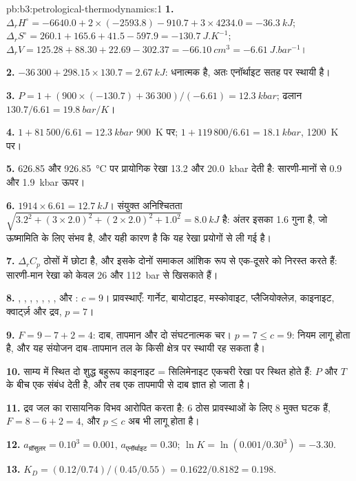 \begin{solution}{pb:b3:petrological-thermodynamics:1}
\textbf{1.} $\Delta_rH^\circ = -6640.0 + 2\times(-2593.8) - 910.7 + 3\times4234.0
= \qty{-36.3}{kJ}$; $\Delta_rS^\circ = 260.1 + 165.6 + 41.5 - 597.9 =
\qty{-130.7}{J.K^{-1}}$; $\Delta_rV = 125.28 + 88.30 + 22.69 - 302.37 =
\qty{-66.10}{cm^3} = \qty{-6.61}{J.bar^{-1}}$।

\textbf{2.} $-36\,300 + 298.15\times130.7 = \qty{+2.67}{kJ}$: धनात्मक है, अतः
एनॉर्थाइट सतह पर स्थायी है।

\textbf{3.} $P = 1 + (900\times(-130.7) + 36\,300)/(-6.61) = \qty{12.3}{kbar}$;
ढलान $130.7/6.61 = \qty{19.8}{bar/K}$।

\textbf{4.} $1 + 81\,500/6.61 = \qty{12.3}{kbar}$ \qty{900}{K} पर; $1 +
119\,800/6.61 = \qty{18.1}{kbar}$, \qty{1200}{K} पर।

\textbf{5.} 626.85 और \qty{926.85}{\celsius} पर प्रायोगिक रेखा
13.2 और \qty{20.0}{kbar} देती है: सारणी-मानों से 0.9 और \qty{1.9}{kbar} ऊपर।

\textbf{6.} $1914\times6.61 = \qty{12.7}{kJ}$। संयुक्त अनिश्चितता
$\sqrt{3.2^2 + (3\times2.0)^2 + (2\times2.0)^2 + 1.0^2} = \qty{8.0}{kJ}$ है: अंतर इसका
1.6 गुना है, जो ऊष्मामिति के लिए संभव है, और यही कारण है कि यह रेखा
प्रयोगों से ली गई है।

\textbf{7.} $\Delta_rC_p$ ठोसों में छोटा है, और इसके दोनों समाकल आंशिक रूप से
एक-दूसरे को निरस्त करते हैं: सारणी-मान रेखा को केवल 26 और \qty{112}{bar} से खिसकाते हैं।

\textbf{8.} , , , , , ,
,  और : $c = 9$। प्रावस्थाएँ: गार्नेट, बायोटाइट,
मस्कोवाइट, प्लैजियोक्लेज़, काइनाइट, क्वार्ट्ज़ और द्रव, $p = 7$।

\textbf{9.} $F = 9 - 7 + 2 = 4$: दाब, तापमान और दो संघटनात्मक
चर। $p = 7 \le c = 9$: नियम लागू होता है, और यह संयोजन
दाब--तापमान तल के किसी क्षेत्र पर स्थायी रह सकता है।

\textbf{10.} साम्य में स्थित दो शुद्ध  बहुरूप
काइनाइट = सिलिमेनाइट एकचरी रेखा पर स्थित होते हैं: $P$ और $T$ के बीच
एक संबंध देती है, और तब एक तापमापी से दाब ज्ञात हो जाता है।

\textbf{11.} द्रव जल का रासायनिक विभव आरोपित करता है: 6 ठोस प्रावस्थाओं
के लिए 8 मुक्त घटक हैं, $F = 8 - 6 + 2 = 4$, और $p \le c$ अब भी
लागू होता है।

\textbf{12.} $a_{\text{ग्रॉसुलर}} = 0.10^3 = 0.001$, $a_{\text{एनॉर्थाइट}} =
0.30$; $\ln K = \ln(0.001/0.30^3) = -3.30$.

\textbf{13.} $K_D = (0.12/0.74)/(0.45/0.55) = 0.1622/0.8182 = 0.198$.


\end{solution}
